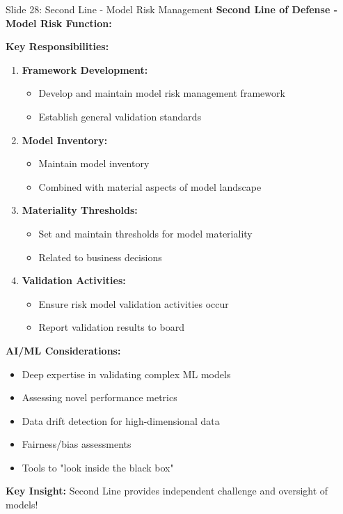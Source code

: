 \documentclass[8pt]{beamer}
\begin{document}
	\begin{frame}{Slide 28: Second Line - Model Risk Management}
		\fontsize{6.5}{7.5}\selectfont
		\textbf{Second Line of Defense - Model Risk Function:}
		
		\vspace{0.1cm}
		\textbf{Key Responsibilities:}
		\begin{enumerate}
			\item \textbf{Framework Development:}
			\begin{itemize}
				\item Develop and maintain model risk management framework
				\item Establish general validation standards
			\end{itemize}
			\item \textbf{Model Inventory:}
			\begin{itemize}
				\item Maintain model inventory
				\item Combined with material aspects of model landscape
			\end{itemize}
			\item \textbf{Materiality Thresholds:}
			\begin{itemize}
				\item Set and maintain thresholds for model materiality
				\item Related to business decisions
			\end{itemize}
			\item \textbf{Validation Activities:}
			\begin{itemize}
				\item Ensure risk model validation activities occur
				\item Report validation results to board
			\end{itemize}
		\end{enumerate}
		
		\vspace{0.1cm}
		\textbf{AI/ML Considerations:}
		\begin{itemize}
			\item Deep expertise in validating complex ML models
			\item Assessing novel performance metrics
			\item Data drift detection for high-dimensional data
			\item Fairness/bias assessments
			\item Tools to "look inside the black box"
		\end{itemize}
		
		\textcolor{myblue}{\textbf{Key Insight:}} Second Line provides \textcolor{myblue}{independent challenge and oversight} of models!
	\end{frame}
	
\end{document}
